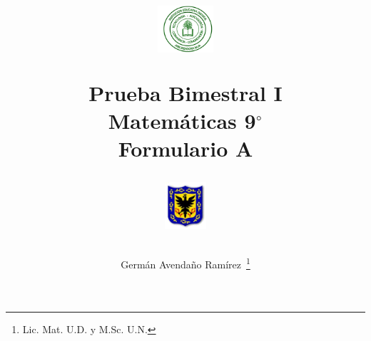 \documentclass[10pt,letterpaper,addpoints]{exam}
\begin{document}
\title{\begin{minipage}{.2\textwidth}
        \includegraphics[height=1.75cm]{Images/logo-colegio.png}
       \end{minipage}
\begin{minipage}{.55\textwidth}
 \begin{center}
Prueba Bimestral I \\Matemáticas 9$^{\circ}$\\Formulario \textbf{A}
\end{center}
\end{minipage}
\begin{minipage}{.2\textwidth}
\includegraphics[height=1.75cm]{Images/logo-sed.png} 
\end{minipage}
}
\author{Germ\'{a}n Avendaño Ram\'{i}rez~\thanks{Lic. Mat. U.D. y M.Sc. U.N.}}
\date{}
\maketitle
\begin{center}
\end{center}
\vspace*{.2in}
\end{document}
